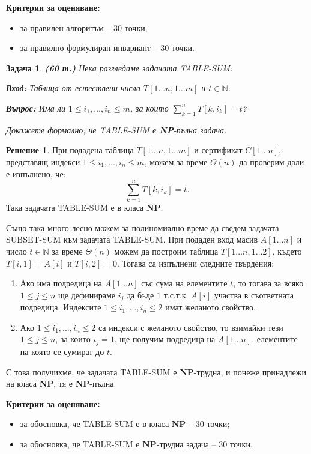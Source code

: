 \documentclass{article}
\newtheorem{problem}{Задача}
\theoremstyle{definition}
\newtheorem*{solution}{Решение}
\begin{document}
\textbf{Критерии за оценяване:}
\begin{itemize}
    \item за правилен алгоритъм -- 30 точки;
    \item за правилно формулиран инвариант -- 30 точки.
\end{itemize}

\pagebreak

\begin{problem} {\bf (60 т.)}
Нека разгледаме задачата {\normalfont TABLE-SUM:}
\vspace*{2mm}

\hspace*{4mm} \textbf{Вход:} Таблица от естествени числа $T[1 \dots n, 1 \dots m]$ и $t \in \mathbb{N}$.

\hspace*{4mm} \textbf{Въпрос:} Има ли $1 \leq i_1, \dots, i_n \leq m$, за които $\sum\limits_{k = 1}^n T[k, i_k] = t$?

\vspace*{1mm}
Докажете формално, че {\normalfont TABLE-SUM} е \textbf{NP}-пълна задача.
\end{problem}

\begin{solution}
    При подадена таблица $T[1 \dots n, 1 \dots m]$ и сертификат $C[1 \dots n]$, представящ индекси $1 \leq i_1, \dots, i_n \leq m$, можем за време $\Theta(n)$ да проверим дали е изпълнено, че:
    \[
        \sum\limits_{k = 1}^n T[k, i_k] = t.
    \]
    Така задачата TABLE-SUM е в класа \textbf{NP}.

    Също така много лесно можем за полиномиално време да сведем задачата SUBSET-SUM към задачата TABLE-SUM.
    При подаден вход масив $A[1 \dots n]$ и число $t \in \mathbb{N}$ за време $\Theta(n)$ можем да построим таблица $T[1 \dots n, 1 \dots 2]$, където $T[i, 1] = A[i]$ и $T[i, 2] = 0$.
    Тогава са изпълнени следните твърдения:
    \begin{enumerate}
        \item Ако има подредица на $A[1 \dots n]$ със сума на елементите $t$, то тогава за всяко $1 \leq j \leq n$ ще дефинираме $i_j$ да бъде $1$ т.с.т.к. $A[i]$ участва в съответната подредица.
              Индексите $1 \leq i_1, \dots, i_n \leq 2$ имат желаното свойство.
        \item Ако $1 \leq i_1, \dots, i_n \leq 2$ са индекси с желаното свойство, то взимайки тези $1 \leq j \leq n$, за които $i_j = 1$, ще получим подредица на $A[1 \dots n]$, елементите на която се сумират до $t$.
    \end{enumerate}
    С това получихме, че задачата TABLE-SUM е \textbf{NP}-трудна, и понеже принадлежи на класа \textbf{NP}, тя е \textbf{NP}-пълна.
\end{solution}

\textbf{Критерии за оценяване:}
\begin{itemize}
    \item за обосновка, че TABLE-SUM е в класа \textbf{NP} -- 30 точки;
    \item за обосновка, че TABLE-SUM е $\textbf{NP}$-трудна задача  -- 30 точки.
\end{itemize}
\end{document}
